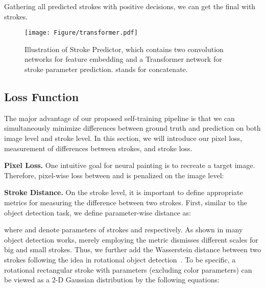 \documentclass[10pt,twocolumn,letterpaper]{article}
\begin{document}
Gathering all predicted strokes with positive decisions, we can get the final  with  strokes. 











\begin{figure}[t]
\begin{center}
\texttt{[image: Figure/transformer.pdf]}
\end{center}
   \caption{Illustration of Stroke Predictor, which contains two convolution networks for feature embedding and a Transformer network for stroke parameter prediction.  stands for concatenate.}
\label{fig:stroke_predictor}
\vspace{-0.5cm}
\end{figure}


\subsection{Loss Function}\label{sec_loss}

The major advantage of our proposed self-training pipeline is that we can simultaneously minimize differences between ground truth and prediction on both image level and stroke level. In this section, we will introduce our pixel loss, measurement of differences between strokes, and stroke loss. 



\noindent
\textbf{Pixel Loss.}
One intuitive goal for neural painting is to recreate a target image.
Therefore, pixel-wise loss  between  and  is penalized on the image level:


\noindent
\textbf{Stroke Distance.}
On the stroke level, it is important to define appropriate metrics for measuring the difference between two strokes.
First, similar to the object detection task, we define parameter-wise  distance as:

where  and  denote parameters of strokes  and  respectively.
As shown in many object detection works, merely employing the  metric dismisses different scales for big and small strokes.
Thus, we further add the Wasserstein distance between two strokes following the idea in rotational object detection~\cite{yang2021rethinking}.
To be specific, a rotational rectangular stroke with parameters  (excluding color parameters) can be viewed as a 2-D Gaussian distribution  by the following equations:
\end{document}
